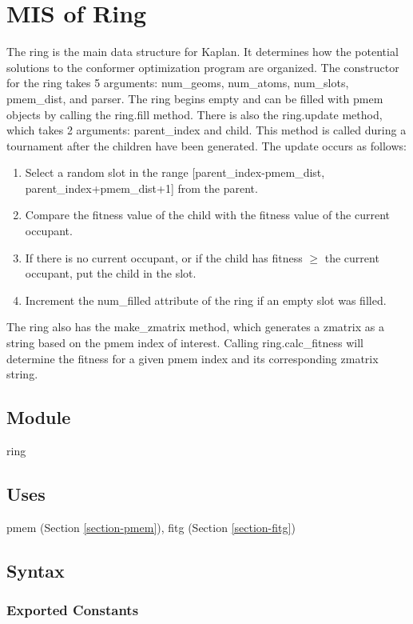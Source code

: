 \documentclass[12pt, titlepage]{article}
\newcommand{\progname}{Kaplan}
\begin{document}
\section{MIS of Ring} \label{section-ring}

The ring is the main data structure for \progname{}. It determines how the 
potential solutions to the conformer optimization program are organized. The 
constructor for the ring takes 5 arguments: num\_geoms, num\_atoms, num\_slots, 
pmem\_dist, and parser. The ring begins empty and can be filled with pmem 
objects by calling the ring.fill method. There is also the ring.update method, 
which takes 2 arguments: parent\_index and child. This method is called during 
a tournament after the children have been generated. The update occurs as 
follows:
\begin{enumerate}
	\item Select a random slot in the range [parent\_index-pmem\_dist, 
	parent\_index+pmem\_dist+1] from 
	the parent.
	\item Compare the fitness value of the child with the fitness value of the 
	current occupant.
	\item If there is no current occupant, or if the child has fitness $\geq$ 
	the current occupant, put the child in the slot.
	\item Increment the num\_filled attribute of the ring if an empty slot was 
	filled.
\end{enumerate}
The ring also has the make\_zmatrix method, which generates a zmatrix as a 
string based on the pmem index of interest. Calling ring.calc\_fitness will 
determine the fitness for a given pmem index and its corresponding zmatrix 
string.

\subsection{Module}

ring

\subsection{Uses}

pmem (Section \ref{section-pmem}),
fitg (Section \ref{section-fitg})

\subsection{Syntax}

\subsubsection{Exported Constants}
\end{document}
